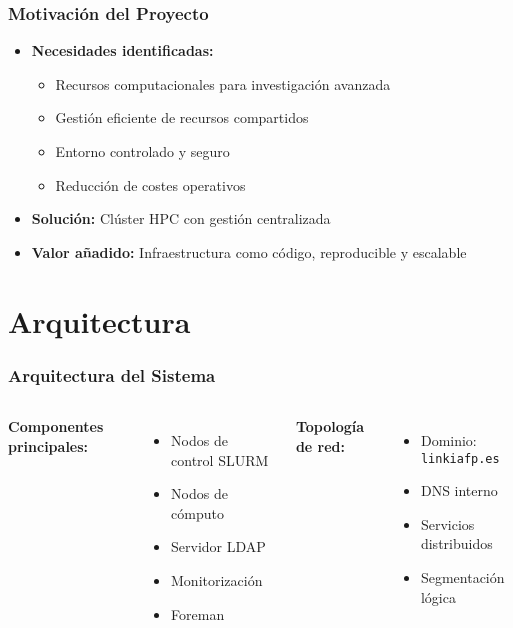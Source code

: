 \documentclass[aspectratio=169]{beamer}
\begin{document}
\begin{frame}
\frametitle{Motivación del Proyecto}
\begin{itemize}
    \item \textbf{Necesidades identificadas:}
    \begin{itemize}
        \item Recursos computacionales para investigación avanzada
        \item Gestión eficiente de recursos compartidos
        \item Entorno controlado y seguro
        \item Reducción de costes operativos
    \end{itemize}
    \item \textbf{Solución:} Clúster HPC con gestión centralizada
    \item \textbf{Valor añadido:} Infraestructura como código, reproducible y escalable
\end{itemize}
\end{frame}

\section{Arquitectura}

\begin{frame}
\frametitle{Arquitectura del Sistema}
\begin{columns}
\textbf{Componentes principales:}
\begin{itemize}
    \item Nodos de control SLURM
    \item Nodos de cómputo
    \item Servidor LDAP
    \item Monitorización
    \item Foreman
\end{itemize}

\textbf{Topología de red:}
\begin{itemize}
    \item Dominio: \texttt{linkiafp.es}
    \item DNS interno
    \item Servicios distribuidos
    \item Segmentación lógica
\end{itemize}
\end{columns}
\end{frame}
\end{document}
